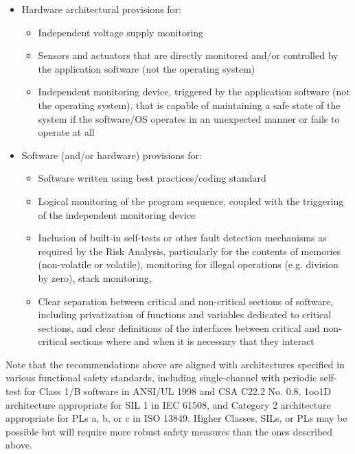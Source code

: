 \documentclass[12pt]{../Common_files/ElisaPaper}
\begin{document}
\begin{itemize}

\item Hardware architectural provisions for:

\begin{itemize}

\item Independent voltage supply monitoring

\item Sensors and actuators that are directly monitored and/or controlled by the application software (not the operating system)

\item Independent monitoring device, triggered by the application software (not the operating system), that is capable of maintaining a safe state of the system if the software/OS operates in an unexpected manner or fails to operate at all

\end{itemize}

\item Software (and/or hardware) provisions for:

\begin{itemize}

\item Software written using best practices/coding standard

\item Logical monitoring of the program sequence, coupled with the triggering of the independent monitoring device

\item Inclusion of built-in self-tests or other fault detection mechanisms as required by the Risk Analysis, particularly for the contents of memories (non-volatile or volatile), monitoring for illegal operations (e.g. division by zero), stack monitoring,

\item Clear separation between critical and non-critical sections of software, including privatization of functions and variables dedicated to critical sections, and clear definitions of the interfaces between critical and non-critical sections where and when it is necessary that they interact

\end{itemize}

\end{itemize}

Note that the recommendations above are aligned with architectures specified in various functional safety standards, including single-channel with periodic self-test for Class 1/B software in ANSI/UL 1998 and CSA C22.2 No. 0.8, 1oo1D architecture appropriate for SIL 1 in IEC 61508, and Category 2 architecture appropriate for PLs a, b, or c in ISO 13849.  
Higher Classes, SILs, or PLs may be possible but will require more robust safety measures than the ones described above.
\end{document}

